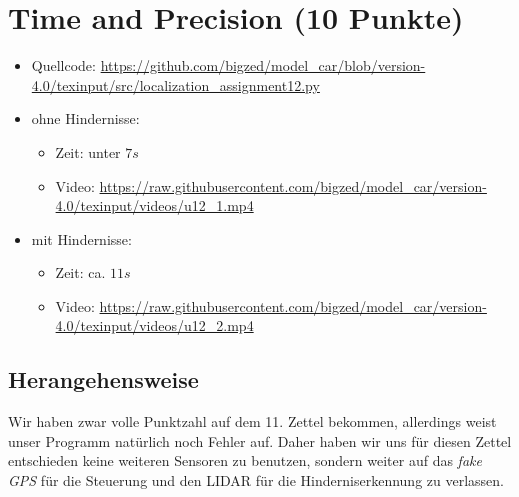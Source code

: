 \documentclass[10pt,oneside,a4paper]{article}
\begin{document}
\section{Time and Precision (10 Punkte)}
    \begin{itemize}
      \item Quellcode:
        \url{https://github.com/bigzed/model_car/blob/version-4.0/texinput/src/localization_assignment12.py}
      \item ohne Hindernisse:
        \begin{itemize}
          \item Zeit: unter $ 7s $
          \item Video:
          \url{https://raw.githubusercontent.com/bigzed/model_car/version-4.0/texinput/videos/u12_1.mp4}
        \end{itemize}
      \item mit Hindernisse:
        \begin{itemize}
          \item Zeit: ca. $ 11s $
          \item Video:
            \url{https://raw.githubusercontent.com/bigzed/model_car/version-4.0/texinput/videos/u12_2.mp4}
        \end{itemize}
    \end{itemize}

    \subsection{Herangehensweise}
      Wir haben zwar volle Punktzahl auf dem 11. Zettel bekommen, allerdings weist unser Programm
      nat\"urlich noch Fehler auf. Daher haben wir uns f\"ur diesen Zettel entschieden keine
      weiteren Sensoren zu benutzen, sondern weiter auf das \emph{fake GPS} f\"ur die Steuerung und
      den LIDAR f\"ur die Hinderniserkennung zu verlassen.
\end{document}
